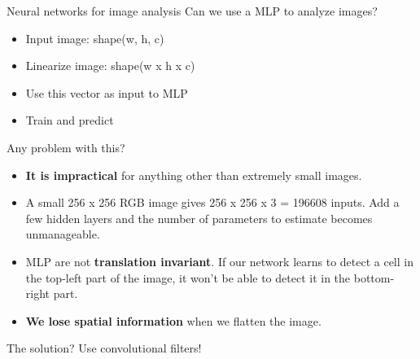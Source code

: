 \documentclass[9pt, aspectratio=169]{beamer}
\begin{document}
\begin{frame}
    {Neural networks for image analysis}
    Can we use a MLP to analyze images?

    \begin{itemize}
        \item Input image: shape(w, h, c)
        \item Linearize image: shape(w x h x c)
        \item Use this vector as input to MLP
        \item Train and predict
    \end{itemize}

    Any problem with this?
    \pause

    \begin{itemize}[<+->]
        \item \textbf{It is impractical} for anything other than extremely small images.
        \item A small 256 x 256 RGB image gives 256 x 256 x 3 = 196608 inputs. Add a few hidden layers and the number of parameters to estimate becomes unmanageable.
        \item MLP are not \textbf{translation invariant}. If our network learns to detect a cell in the top-left part of the image, it won't be able to detect it in the bottom-right part.
        \item \textbf{We lose spatial information} when we flatten the image.
    \end{itemize}
\end{frame}

\begin{frame}
    {The solution?}
    \LARGE
    \centering
    Use convolutional filters!
\end{frame}
\end{document}
